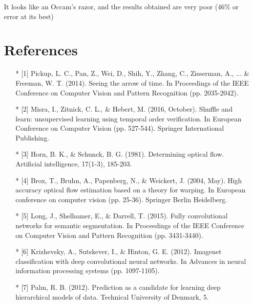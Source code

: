 \documentclass[10pt,a4paper]{report}
\begin{document}
		It looks like an Occam's razor, and the results obtained are very poor (46\% or error at its best)
		
		\section*{References}
		\scriptsize{
		\begin{itemize}
			
			\item[*] [1] Pickup, L. C., Pan, Z., Wei, D., Shih, Y., Zhang, C., Zisserman, A., ... \& Freeman, W. T. (2014). Seeing the arrow of time. In Proceedings of the IEEE Conference on Computer Vision and Pattern Recognition (pp. 2035-2042).
			
			\item[*] [2] Misra, I., Zitnick, C. L., \& Hebert, M. (2016, October). Shuffle and learn: unsupervised learning using temporal order verification. In European Conference on Computer Vision (pp. 527-544). Springer International Publishing.
			
			\item[*] [3] Horn, B. K., \& Schunck, B. G. (1981). Determining optical flow. Artificial intelligence, 17(1-3), 185-203.
			
			\item[*] [4] Brox, T., Bruhn, A., Papenberg, N., \& Weickert, J. (2004, May). High accuracy optical flow estimation based on a theory for warping. In European conference on computer vision (pp. 25-36). Springer Berlin Heidelberg.
			
			\item[*] [5] Long, J., Shelhamer, E., \& Darrell, T. (2015). Fully convolutional networks for semantic segmentation. In Proceedings of the IEEE Conference on Computer Vision and Pattern Recognition (pp. 3431-3440).
			
			\item[*] [6] Krizhevsky, A., Sutskever, I., \& Hinton, G. E. (2012). Imagenet classification with deep convolutional neural networks. In Advances in neural information processing systems (pp. 1097-1105).
			
			\item[*] [7] Palm, R. B. (2012). Prediction as a candidate for learning deep hierarchical models of data. Technical University of Denmark, 5.
			
		\end{itemize}
	}
	
\end{document}
